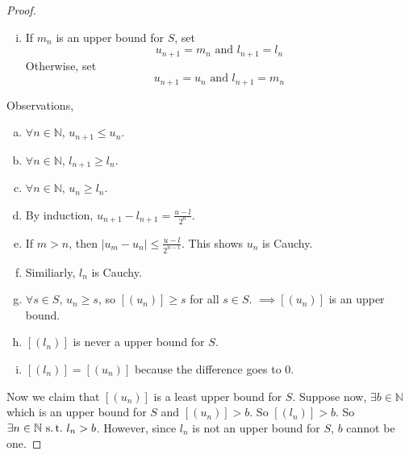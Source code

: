 \documentclass[12pt]{amsart}
\newcommand{\bbN}{\mathbb{N}}
\newcommand{\suchthat}{\operatorname{\thinspace s.t. \thinspace}}
\theoremstyle{plain}
\theoremstyle{remark}
\theoremstyle{definition}
\begin{document}
\begin{enumerate}[(1)]
\begin{proof}
\begin{enumerate}[(i)]
				\item	
					If $m_n$ is an upper bound for $S$, set
					\begin{equation*}
						u_{n+1} = m_n \mbox{ and } l_{n+1} = l_n
					\end{equation*}
					Otherwise, set 
					\begin{equation*}
						u_{n+1} = u_n \mbox{ and } l_{n+1} = m_n
					\end{equation*}
			\end{enumerate}
			Observations,
			\begin{enumerate}[(a)]
				\item 
					$\forall n \in \bbN$, $u_{n+1} \leqslant u_n$.
				\item
					$\forall n \in \bbN$, $l_{n+1} \geqslant l_n$.
				\item
					$\forall n \in \bbN$, $u_n \geqslant l_n$.
				\item
					By induction, $u_{n+1} - l_{n+1} = \displaystyle \frac{u-l}{2^n}$.
				\item
					If $m> n$, then	$|u_m - u_n| \leqslant \displaystyle \frac{u-l}{2^{n-1}}$.
					\noindent This shows $u_n$ is Cauchy.
				\item
					Similiarly, $l_n$ is Cauchy.
				\item
					$\forall s\in S$, $u_n \geqslant s$, so $[(u_n)] \geqslant s$ for all $s\in S$.
					\newline
					$\implies[(u_n)]$ is an upper bound.
				\item
					$[(l_n)]$ is never a upper bound for $S$.
				\item
					$[(l_n)] = [(u_n)]$ because the difference goes to $0$.
			\end{enumerate}

			Now we claim that $[(u_n)]$ is a least upper bound for $S$. Suppose now, $\exists b \in \bbN$ which is an upper bound for $S$ and $[(u_n)]>b$. So $[(l_n)] > b$. So $\exists n \in \bbN \suchthat l_n > b$. However, since $l_n$ is not an upper bound for $S$, $b$ cannot be one.
			
		\end{proof}
\end{enumerate}
\end{document}
